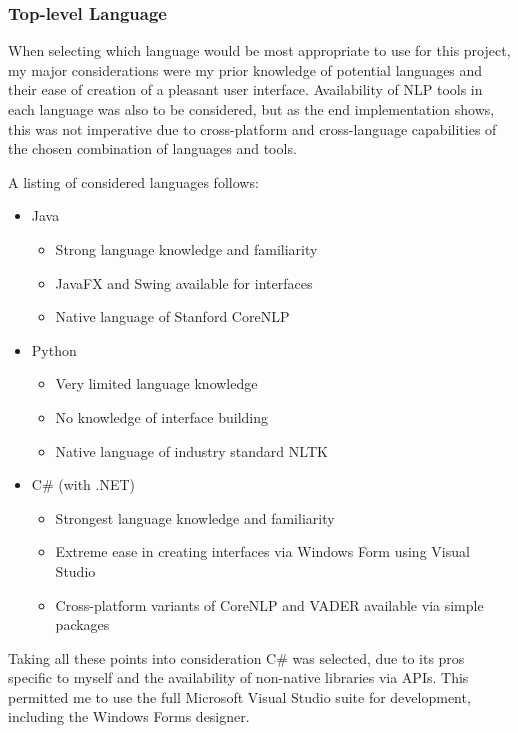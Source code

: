 \documentclass{article}
\begin{document}
{        \subsubsection{Top-level Language}
        \label{subsec:language}
        When selecting which language would be most appropriate to use for this project, my major considerations were my prior knowledge of potential languages and their ease of creation of a pleasant user interface. Availability of NLP tools in each language was also to be considered, but as the end implementation shows, this was not imperative due to cross-platform and cross-language capabilities of the chosen combination of languages and tools.

        A listing of considered languages follows:

        \begin{itemize}
            \item Java
            \begin{itemize}
                \item Strong language knowledge and familiarity
                \item JavaFX and Swing available for interfaces
                \item Native language of Stanford CoreNLP
            \end{itemize}
            \item Python
            \begin{itemize}
                \item Very limited language knowledge
                \item No knowledge of interface building
                \item Native language of industry standard NLTK
            \end{itemize}
            \item C\# (with .NET)
            \begin{itemize}
                \item Strongest language knowledge and familiarity
                \item Extreme ease in creating interfaces via Windows Form using Visual Studio
                \item Cross-platform variants of CoreNLP and VADER available via simple packages
            \end{itemize}
        \end{itemize}
        Taking all these points into consideration C\# was selected, due to its pros specific to myself and the availability of non-native libraries via APIs. This permitted me to use the full Microsoft Visual Studio suite for development, including the Windows Forms designer.
}
\end{document}
